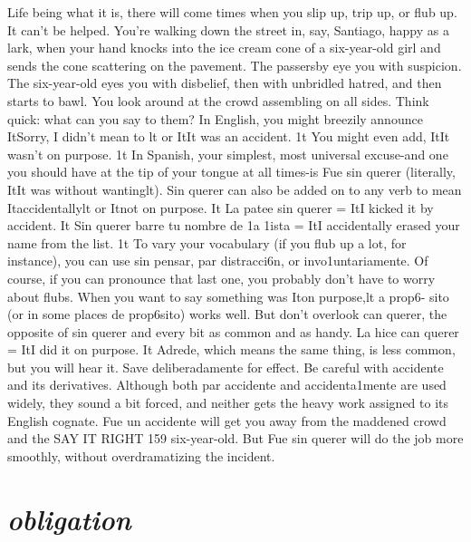 \documentclass[14pt,a4paper,oneside]{memoir}
\begin{document}
{{{{%
Life being what it is, there will come times when you slip up,
trip up, or flub up. It can't be helped. You're walking down the street
in, say, Santiago, happy as a lark, when your hand knocks into the ice
cream cone of a six-year-old girl and sends the cone scattering on the
pavement. The passersby eye you with suspicion. The six-year-old eyes
you with disbelief, then with unbridled hatred, and then starts to bawl.
You look around at the crowd assembling on all sides. Think quick:
what can you say to them?
In English, you might breezily announce ItSorry, I didn't mean
to lt or ItIt was an accident. 1t You might even add, ItIt wasn't on purpose. 1t In Spanish, your simplest, most universal excuse-and one you
should have at the tip of your tongue at all times-is Fue sin querer
(literally, ItIt was without wantinglt). Sin querer can also be added on
to any verb to mean Itaccidentallylt or Itnot on purpose. It La patee sin
querer = ItI kicked it by accident. It Sin querer barre tu nombre de 1a
1ista = ItI accidentally erased your name from the list. 1t To vary your
vocabulary (if you flub up a lot, for instance), you can use sin pensar,
par distracci6n, or invo1untariamente. Of course, if you can pronounce
that last one, you probably don't have to worry about flubs.
When you want to say something was Iton purpose,lt a prop6-
sito (or in some places de prop6sito) works well. But don't overlook
can querer, the opposite of sin querer and every bit as common and
as handy. La hice can querer = ItI did it on purpose. It Adrede, which
means the same thing, is less common, but you will hear it. Save deliberadamente for effect.
Be careful with accidente and its derivatives. Although both
par accidente and accidenta1mente are used widely, they sound a bit
forced, and neither gets the heavy work assigned to its English cognate.
Fue un accidente will get you away from the maddened crowd and the
SAY IT RIGHT 159
six-year-old. But Fue sin querer will do the job more smoothly, without overdramatizing the incident.

\section{\emph{obligation}}

}}}}
\end{document}
